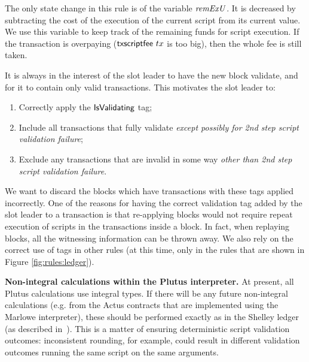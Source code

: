 The only state change in this rule is of the variable $\mathit{remExU}$.
It is decreased by subtracting the cost of the execution of the
current script from its current value.
We use this variable to keep track of the remaining funds for
script execution. If the transaction is overpaying ($\mathsf{txscriptfee}~{tx}$
is too big), then the whole fee is still taken.

It is always in the interest of the slot leader to have the new block validate,
and for it to contain only valid transactions. This motivates the
slot leader to:

\begin{enumerate}
  \item Correctly apply the $\mathsf{IsValidating}$ tag;
  \item Include all transactions that fully validate
  \textit{except possibly for 2nd step script validation failure};
  \item Exclude any transactions that are invalid in some way \textit{other than 2nd step script validation failure}.
\end{enumerate}

We want to
discard the blocks which have transactions with these tags
applied incorrectly.
One of the reasons for having the correct validation tag added by the slot leader
to a transaction is that re-applying blocks would not require repeat
execution of scripts in the transactions inside a block. In fact, when replaying
blocks, all the witnessing information can be thrown away.
We also rely on the correct use of tags in other rules (at this time, only in
the rules that are shown in Figure \ref{fig:rules:ledger}).


\textbf{Non-integral calculations within the Plutus interpreter.} At present, all Plutus calculations use integral types. If there
will be any future non-integral calculations (e.g. from the Actus contracts that are implemented using
the Marlowe interpreter), these should
be performed exactly as in the Shelley ledger (as described in~\cite{non_int}). This is a matter of
ensuring deterministic script validation outcomes: inconsistent rounding, for example, could
result in different validation outcomes running the same script on the same
arguments.


